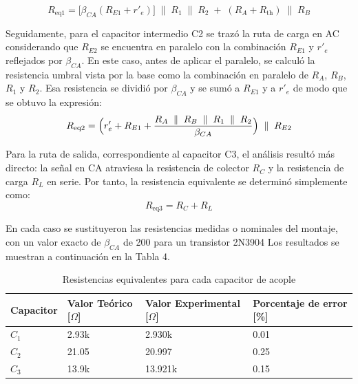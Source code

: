 \documentclass[journal]{IEEEtran}
\begin{document}
\begin{equation}
R_{\mathrm{eq1}} = \bigl[\beta_{CA} (R_{E1}+r'_e)\bigr]\;\parallel\;R_1\;\parallel\;R_2
\;+\;
(R_A + R_{\mathrm{th}})\;\parallel\;R_B
\end{equation}
\par Seguidamente, para el capacitor intermedio C2 se trazó la ruta de carga en AC considerando que \( R_{E2} \) se encuentra en paralelo con la combinación \( R_{E1} \) y \( r'_e \) reflejados por $\beta_{CA}$. En este caso, antes de aplicar el paralelo, se calculó la resistencia umbral vista por la base como la combinación en paralelo de \( R_A \), \( R_B \), \( R_1 \) y \( R_2 \). Esa resistencia se dividió por $\beta_{CA}$ y se sumó a \( R_{E1} \) y a \( r'_e \) de modo que se obtuvo la expresión:
\begin{equation}
R_{\mathrm{eq2}}= \Bigl(r'_e + R_{E1} + \frac{R_A \;\parallel\; R_B\;\parallel\; R_1\;\parallel\; R_2}{\beta_{CA}}\Bigr)\;\parallel\;R_{E2}
\end{equation}
\par Para la ruta de salida, correspondiente al capacitor C3, el análisis resultó más directo: la señal en CA atraviesa la resistencia de colector \( R_C \) y la resistencia de carga \( R_L \) en serie. Por tanto, la resistencia equivalente se determinó simplemente como:
\begin{equation}
R_{\mathrm{eq3}}= R_C + R_L
\end{equation}
\par En cada caso se sustituyeron las resistencias medidas o nominales del montaje, con un valor exacto de $\beta_{CA}$ de 200 para un transistor 2N3904 Los resultados se muestran a continuación en la Tabla 4.
\begin{table}[h]
    \caption{Resistencias equivalentes para cada capacitor de acople}
    \centering
    \renewcommand{\arraystretch}{1.2} %
    \begin{tabular}{|l|p{2cm}|p{2cm}|p{2cm}|}
        \hline
        {Capacitor} & \textbf{Valor Teórico [$\Omega$]} & \textbf{Valor Experimental [$\Omega$]} & \textbf{Porcentaje de error [\%]} \\
        \hline
        \( C_1\) & 2.93k  & 2.930k  & 0.01 \\
        \hline
        \( C_2 \) & 21.05  & 20.997  & 0.25 \\
        \hline
        \( C_3 \) & 13.9k & 13.921k & 0.15 \\
        \hline
    \end{tabular}
    \label{tab:resistenciasequivalentes}
\end{table}
\end{document}
